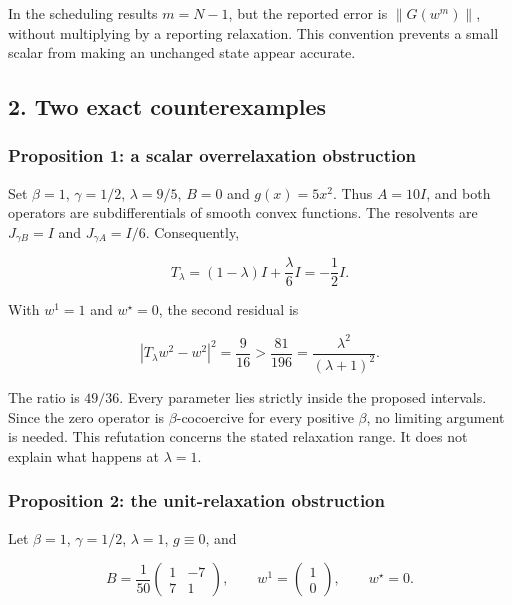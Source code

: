 \documentclass[
  british,
  11pt,
  a4paper,
]{article}
\let\oldsubsection\subsection
\renewcommand{\subsection}{\Needspace{5\baselineskip}\oldsubsection}
\begin{document}
In the scheduling results \(m=N-1\), but the reported error is
\(\|G(w^m)\|\), without multiplying by a reporting relaxation. This
convention prevents a small scalar from making an unchanged state appear
accurate.

\subsection{2. Two exact
counterexamples}\label{two-exact-counterexamples}

\subsubsection{Proposition 1: a scalar overrelaxation
obstruction}\label{proposition-1-a-scalar-overrelaxation-obstruction}

Set \(\beta=1\), \(\gamma=1/2\), \(\lambda=9/5\), \(B=0\) and
\(g(x)=5x^2\). Thus \(A=10I\), and both operators are subdifferentials
of smooth convex functions. The resolvents are \(J_{\gamma B}=I\) and
\(J_{\gamma A}=I/6\). Consequently,

\[T_\lambda=(1-\lambda)I+\frac{\lambda}{6}I=-\frac12I.\]

With \(w^1=1\) and \(w^\star=0\), the second residual is

\[
|T_\lambda w^2-w^2|^2=\frac9{16}
>\frac{81}{196}
=\frac{\lambda^2}{(\lambda+1)^2}.
\tag{3}
\]

The ratio is \(49/36\). Every parameter lies strictly inside the
proposed intervals. Since the zero operator is \(\beta\)-cocoercive for
every positive \(\beta\), no limiting argument is needed. This
refutation concerns the stated relaxation range. It does not explain
what happens at \(\lambda=1\).

\subsubsection{Proposition 2: the unit-relaxation
obstruction}\label{proposition-2-the-unit-relaxation-obstruction}

Let \(\beta=1\), \(\gamma=1/2\), \(\lambda=1\), \(g\equiv0\), and

\[
B=\frac1{50}
\begin{pmatrix}1&-7\\7&1\end{pmatrix},
\qquad w^1=\begin{pmatrix}1\\0\end{pmatrix},
\qquad w^\star=0.
\tag{4}
\]
\end{document}
